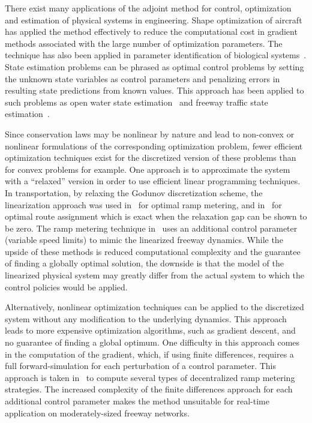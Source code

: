 There exist many applications of the adjoint method for control, optimization 
and estimation of physical systems in engineering. Shape optimization of 
aircraft~\cite{Reuther1996,Giles1997,Moin1994} has applied the method 
effectively to reduce the computational cost in gradient methods associated 
with the large number of optimization parameters. The technique has also been 
applied in parameter identification of biological systems~\cite{Raffard2008}. 
State estimation problems can be phrased as optimal control problems by setting 
the unknown state variables as control parameters and penalizing errors in 
resulting state predictions from known values. This approach has been applied 
to such problems as open water state estimation~\cite{Castaings2006,Strub2009} 
and freeway traffic state estimation~\cite{Jacqueta}.

Since conservation laws may be nonlinear by nature and lead to non-convex or 
nonlinear formulations of the corresponding optimization problem, fewer 
efficient optimization techniques exist for the 
discretized version of these problems than for convex problems for example. One 
approach is to approximate the system with a ``relaxed'' version in order to 
use efficient linear programming techniques. In transportation, by 
relaxing the Godunov discretization scheme, the linearization approach was used 
in~\cite{gomes2006optimal} for optimal ramp metering, and 
in~\cite{ziliaskopoulos2000linear} for optimal route assignment which is exact 
when the relaxation gap can be shown to be zero. The ramp 
metering technique in~\cite{Muralidharana} uses an additional control parameter 
(variable speed limits) to mimic the linearized freeway dynamics. While the 
upside of these methods is reduced computational complexity and the guarantee 
of finding a globally optimal solution, the downside is that the model of the 
linearized physical system may greatly differ from the actual system to which 
the control policies would be applied.

Alternatively, nonlinear optimization techniques can be applied to the 
discretized system without any modification to the underlying dynamics. This 
approach leads to more expensive optimization algorithms, such as gradient 
descent, and no guarantee of finding a global optimum. One difficulty in this 
approach comes in the computation of the gradient, which, if using finite 
differences, requires a full forward-simulation for each perturbation of a 
control parameter. This approach is taken in~\cite{Ramon2013,Frejo2011} to 
compute several types of decentralized ramp metering strategies. The increased 
complexity of the finite differences approach for each additional control 
parameter makes the method unsuitable for real-time application on 
moderately-sized freeway networks.

